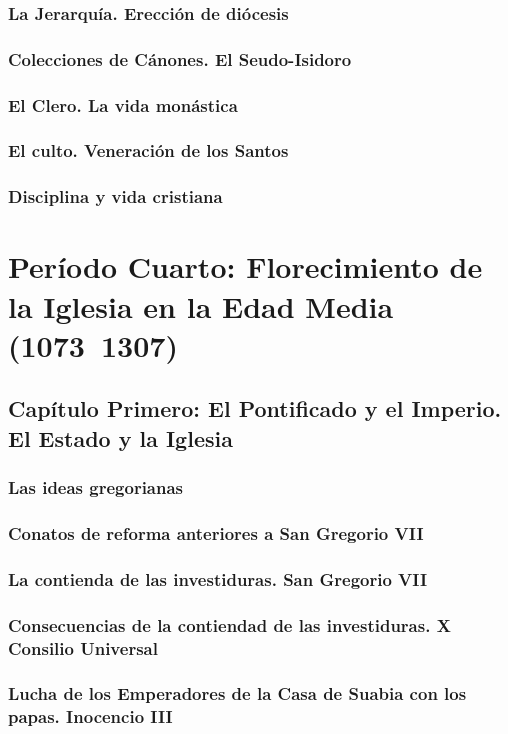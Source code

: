 \raggedbottom{} \documentclass[12pt, a4paper]{book}
\begin{document}
\section{La Jerarquía. Erección de diócesis}
\section{Colecciones de Cánones. El Seudo-Isidoro}
\section{El Clero. La vida monástica}
\section{El culto. Veneración de los Santos}
\section{Disciplina y vida cristiana}
\part{Período Cuarto: Florecimiento de la Iglesia en la Edad Media (1073~1307)}
\chapter{Capítulo Primero: El Pontificado y el Imperio. El Estado y la Iglesia}
\section{Las ideas gregorianas}
\section{Conatos de reforma anteriores a San Gregorio VII}
\section{La contienda de las investiduras. San Gregorio VII}
\section{Consecuencias de la contiendad de las investiduras. X Consilio Universal}
\section{Lucha de los Emperadores de la Casa de Suabia con los papas. Inocencio III}
\end{document}
